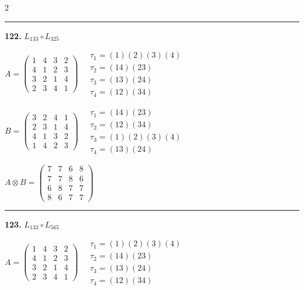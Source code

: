\begin{multicols}{2}
\vspace{0.3em}
\hrule
\vspace{0.3em}

\noindent\textbf{122.} $L_{133} \circ L_{325}$

$A = \begin{pmatrix} 1 & 4 & 3 & 2 \\ 4 & 1 & 2 & 3 \\ 3 & 2 & 1 & 4 \\ 2 & 3 & 4 & 1 \end{pmatrix} \quad \begin{matrix} \tau_{1}=(1)(2)(3)(4) \\ \tau_{2}=(1 4)(2 3) \\ \tau_{3}=(1 3)(2 4) \\ \tau_{4}=(1 2)(3 4) \end{matrix}$

$B = \begin{pmatrix} 3 & 2 & 4 & 1 \\ 2 & 3 & 1 & 4 \\ 4 & 1 & 3 & 2 \\ 1 & 4 & 2 & 3 \end{pmatrix} \quad \begin{matrix} \tau_{1}=(1 4)(2 3) \\ \tau_{2}=(1 2)(3 4) \\ \tau_{3}=(1)(2)(3)(4) \\ \tau_{4}=(1 3)(2 4) \end{matrix}$

$A \otimes B = \begin{pmatrix} 7 & 7 & 6 & 8 \\ 7 & 7 & 8 & 6 \\ 6 & 8 & 7 & 7 \\ 8 & 6 & 7 & 7 \end{pmatrix}$

\vspace{0.3em}
\hrule
\vspace{0.3em}

\noindent\textbf{123.} $L_{133} \circ L_{565}$

$A = \begin{pmatrix} 1 & 4 & 3 & 2 \\ 4 & 1 & 2 & 3 \\ 3 & 2 & 1 & 4 \\ 2 & 3 & 4 & 1 \end{pmatrix} \quad \begin{matrix} \tau_{1}=(1)(2)(3)(4) \\ \tau_{2}=(1 4)(2 3) \\ \tau_{3}=(1 3)(2 4) \\ \tau_{4}=(1 2)(3 4) \end{matrix}$


\end{multicols}
